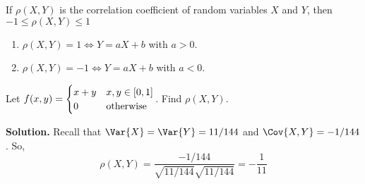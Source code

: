 \begin{Theorem}{}{}
    If $ \rho(X,Y) $ is the correlation coefficient
    of random variables $ X $ and $ Y $, then
    $ -1\leqslant \rho(X,Y)\leqslant 1 $
    \begin{enumerate}[label=(\arabic*)]
        \item $ \rho(X,Y)=1\iff Y=aX+b $ with $ a>0 $.
        \item $ \rho(X,Y)=-1\iff Y=aX+b $ with $ a<0 $.
    \end{enumerate}
\end{Theorem}
\begin{Example}{}{}
    Let $ \displaystyle f(x,y)=\begin{cases}
            x+y & x,y\in\interval{0}{1} \\
            0   & \text{otherwise}
        \end{cases} $.
    Find $ \rho(X,Y) $.

    \textbf{Solution.} Recall that $ \Var{X}=\Var{Y}=11/144 $
    and $ \Cov{X,Y}=-1/144 $. So,
    \[ \rho(X,Y)=\frac{-1/144}{\sqrt{11/144}\sqrt{11/144}} =-\frac{1}{11}  \]

\end{Example}
